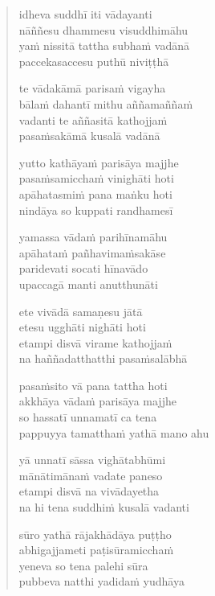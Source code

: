

\cleartoverso

\vspace*{30mm}

\begin{verse}

idheva suddhī iti vādayanti\\
nāññesu dhammesu visuddhimāhu\\
yaṁ nissitā tattha subhaṁ vadānā\\
paccekasaccesu puthū niviṭṭhā

te vādakāmā parisaṁ vigayha\\
bālaṁ dahantī mithu aññamaññaṁ\\
vadanti te aññasitā kathojjaṁ\\
pasaṁsakāmā kusalā vadānā

yutto kathāyaṁ parisāya majjhe\\
pasaṁsamicchaṁ vinighāti hoti\\
apāhatasmiṁ pana maṅku hoti\\
nindāya so kuppati randhamesī

yamassa vādaṁ parihīnamāhu\\
apāhataṁ pañhavimaṁsakāse\\
paridevati socati hīnavādo\\
upaccagā manti anutthunāti

ete vivādā samaṇesu jātā\\
etesu ugghāti nighāti hoti\\
etampi disvā virame kathojjaṁ\\
na haññadatthatthi pasaṁsalābhā

pasaṁsito vā pana tattha hoti\\
akkhāya vādaṁ parisāya majjhe\\
so hassatī unnamatī ca tena\\
pappuyya tamatthaṁ yathā mano ahu

yā unnatī sāssa vighātabhūmi\\
mānātimānaṁ vadate paneso\\
etampi disvā na vivādayetha\\
na hi tena suddhiṁ kusalā vadanti

sūro yathā rājakhādāya puṭṭho\\
abhigajjameti paṭisūramicchaṁ\\
yeneva so tena palehi sūra\\
pubbeva natthi yadidaṁ yudhāya


\end{verse}
